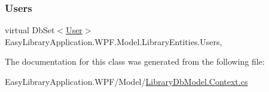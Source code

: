 \mbox{\label{class_easy_library_application_1_1_w_p_f_1_1_model_1_1_library_entities_acaf021c9f17998d4c592e8543d40cbe7}} 
\subsubsection{\texorpdfstring{Users}{Users}}
{\footnotesize\ttfamily virtual Db\+Set$<$\mbox{\hyperlink{class_easy_library_application_1_1_w_p_f_1_1_model_1_1_user}{User}}$>$ Easy\+Library\+Application.\+W\+P\+F.\+Model.\+Library\+Entities.\+Users\hspace{0.3cm}{\ttfamily [get]}, {\ttfamily [set]}}



The documentation for this class was generated from the following file\+:\begin{DoxyCompactItemize}
\item 
Easy\+Library\+Application.\+W\+P\+F/\+Model/\mbox{\hyperlink{_library_db_model_8_context_8cs}{Library\+Db\+Model.\+Context.\+cs}}\end{DoxyCompactItemize}
